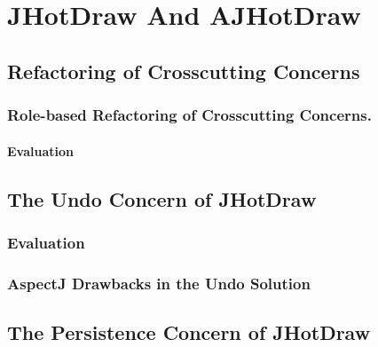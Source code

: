 \chapter{JHotDraw And AJHotDraw}\label{JHotDraw And AJHotDraw}

\section{Refactoring of Crosscutting Concerns}

\subsection{Role-based Refactoring of Crosscutting Concerns.}

\subsubsection{Evaluation}

\section{The Undo Concern of JHotDraw}

\subsection{Evaluation}

\subsection{AspectJ Drawbacks in the Undo Solution}

\section{The Persistence Concern of JHotDraw}
